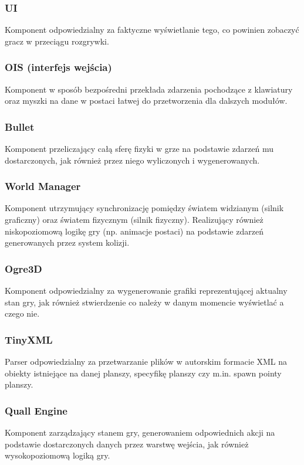 \documentclass[12pt,a4paper,twoside]{article}
\begin{document}


\subsubsection{UI}
Komponent odpowiedzialny za faktyczne wyświetlanie tego, co powinien zobaczyć gracz w przeciągu rozgrywki.
\subsubsection{OIS (interfejs wejścia)}
Komponent w sposób bezpośredni przekłada zdarzenia pochodzące z klawiatury oraz myszki na dane w postaci łatwej do przetworzenia dla dalszych modułów.
\subsubsection{Bullet}
Komponent przeliczający całą sferę fizyki w grze na podstawie zdarzeń mu dostarczonych, jak również przez niego wyliczonych i wygenerowanych.
\subsubsection{World Manager}
Komponent utrzymujący synchronizację pomiędzy światem widzianym (silnik graficzny) oraz światem fizycznym (silnik fizyczny). Realizujący również niskopoziomową logikę gry (np. animacje postaci) na podstawie zdarzeń generowanych przez system kolizji.
\subsubsection{Ogre3D}
Komponent odpowiedzialny za wygenerowanie grafiki reprezentującej aktualny stan gry, jak również stwierdzenie co należy w danym momencie wyświetlać a czego nie.
\subsubsection{TinyXML}
Parser odpowiedzialny za przetwarzanie plików w autorskim formacie XML na obiekty istniejące na danej planszy, specyfikę planszy czy m.in. spawn pointy planszy.
\subsubsection{Quall Engine}
Komponent zarządzający stanem gry, generowaniem odpowiednich akcji na podstawie dostarczonych danych przez warstwę wejścia, jak również wysokopoziomową logiką gry.
\end{document}

